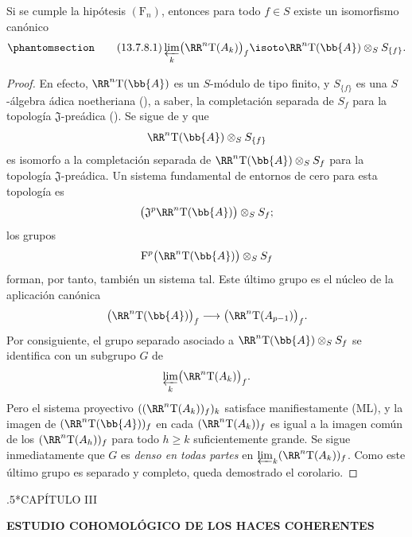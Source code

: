 \documentclass[oneside]{amsart}
\makeatletter
\renewcommand*{\section}{%
  \@startsection{section}{1}{\z@}{.7\linespacing\@plus\linespacing}%
  {.5\linespacing}{\normalfont\bfseries\Large\scshape\centering}}
\renewcommand{\geq}{\geqslant}
\newcommand{\oldpage}[2][]{{\marginnote{\normalfont\textbf{#1}~|~#2}}\ignorespaces}
\let\EGAOriginalLabel\label
\renewcommand{\label}[1]{\phantomsection\EGAOriginalLabel{#1}}
\makeatother
\begin{document}
\begin{corollary}[13.7.8]
\label{0.13.7.8}
Si se cumple la hipótesis $(\mathrm{F}_n)$, entonces para todo $f\in S$
existe un isomorfismo canónico
\begin{equation}
\label{0.13.7.8.1}
\tag{13.7.8.1}
  \varprojlim_k\bigl(\RR^n\mathrm{T}(A_k)\bigr)_f
  \isoto
  \RR^n\mathrm{T}(\bb{A})\otimes_S S_{\{f\}}.
\end{equation}
\end{corollary}

\begin{proof}
En efecto, $\RR^n\mathrm{T}(\bb{A})$ es un $S$-módulo de tipo finito,
y $S_{\{f\}}$ es una $S$-álgebra ádica noetheriana
(), a saber, la completación separada
de $S_f$ para la topología $\mathfrak{J}$-preádica
().
Se sigue de  y
 que
\[
  \RR^n\mathrm{T}(\bb{A})\otimes_S S_{\{f\}}
\]
es isomorfo a la completación separada de
$\RR^n\mathrm{T}(\bb{A})\otimes_S S_f$ para la
topología $\mathfrak{J}$-preádica.
Un sistema fundamental de entornos de cero para esta topología
es
\[
  \bigl(
    \mathfrak{J}^p\RR^n\mathrm{T}(\bb{A})
  \bigr)\otimes_S S_f;
\]
los grupos
\[
  \mathrm{F}^p\bigl(\RR^n\mathrm{T}(\bb{A})\bigr)
  \otimes_S S_f
\]
forman, por tanto, también un sistema tal.
Este último grupo es el núcleo de la aplicación canónica
\[
  \bigl(\RR^n\mathrm{T}(\bb{A})\bigr)_f
  \longrightarrow
  \bigl(\RR^n\mathrm{T}(A_{p-1})\bigr)_f.
\]
Por consiguiente, el grupo separado asociado a
$\RR^n\mathrm{T}(\bb{A})\otimes_S S_f$ se identifica con un subgrupo
$G$ de
\[
  \varprojlim_k\bigl(\RR^n\mathrm{T}(A_k)\bigr)_f.
\]
Pero el sistema proyectivo
$((\RR^n\mathrm{T}(A_k))_f)_k$ satisface manifiestamente {\rm(ML)}, y la
imagen de $(\RR^n\mathrm{T}(\bb{A}))_f$ en cada
$(\RR^n\mathrm{T}(A_k))_f$ es igual a la imagen común de los
$(\RR^n\mathrm{T}(A_h))_f$ para todo $h\geq k$ suficientemente grande.
Se sigue inmediatamente que $G$ es \emph{denso en todas partes} en
$\varprojlim_k(\RR^n\mathrm{T}(A_k))_f$.
Como este último grupo es separado y completo, queda demostrado el
corolario.
\end{proof}


\clearpage
{}
\label{section:ega3}
\section*{CAPÍTULO III}
\setcounter{section}{0}
\setcounter{subsection}{0}
\setcounter{equation}{0}
\begin{center}
\Large\bfseries ESTUDIO COHOMOLÓGICO DE LOS HACES COHERENTES
\end{center}
\oldpage[III]{81}
\end{document}
